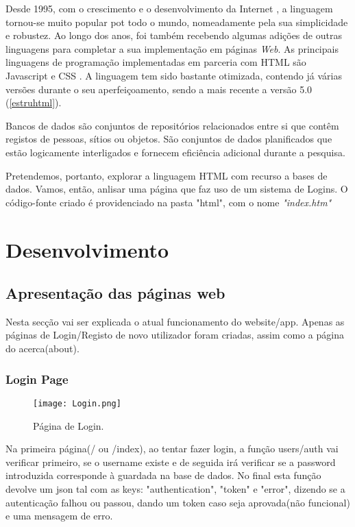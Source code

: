 \documentclass[11pt,openright,twoside]{report}
\begin{document}
Desde 1995, com o crescimento e o desenvolvimento da Internet \cite{Internetus}, a linguagem tornou-se muito popular pot todo o mundo, nomeadamente pela sua simplicidade e robustez. Ao longo dos anos, foi também recebendo algumas adições de outras linguagens para completar a sua implementação em páginas \textit{Web}. As principais linguagens de programação implementadas em parceria com HTML são Javascript \cite{Javascript} e CSS \cite{Css}. A linguagem tem sido bastante otimizada, contendo já várias versões durante o seu aperfeiçoamento, sendo a mais recente a versão 5.0 \citep{w3c} (\autoref{estruhtml}).
\smallskip 


Bancos de dados são conjuntos de repositórios relacionados entre si que contêm registos de pessoas, sítios ou objetos. São conjuntos de dados planificados que estão logicamente interligados e fornecem eficiência adicional durante a pesquisa.
\smallskip

Pretendemos, portanto, explorar a linguagem HTML com recurso a bases de dados. Vamos, então, anlisar uma página que faz uso de um sistema de Logins. O código-fonte criado é providenciado na pasta "html", com o nome \textit{"index.htm"}%

\part{Desenvolvimento}

\chapter{Apresentação das páginas web}
Nesta secção vai ser explicada o atual funcionamento do website/app. Apenas as páginas de Login/Registo de novo utilizador foram criadas, assim como a página do acerca(about).
\smallskip

\section{Login Page}
\begin{figure}
 \center
 \texttt{[image: Login.png]}
 \caption{Página de Login.}
 \label{bse}
\end{figure}

Na primeira página(/ ou /index), ao tentar fazer login, a função users/auth vai verificar primeiro, se o username existe e de seguida irá verificar se a password introduzida corresponde à guardada na base de dados. No final esta função devolve um json tal com as keys: "authentication", "token" e "error", dizendo se a autenticação falhou ou passou, dando um token caso seja aprovada(não funcional) e uma mensagem de erro.
\smallskip
\end{document}
